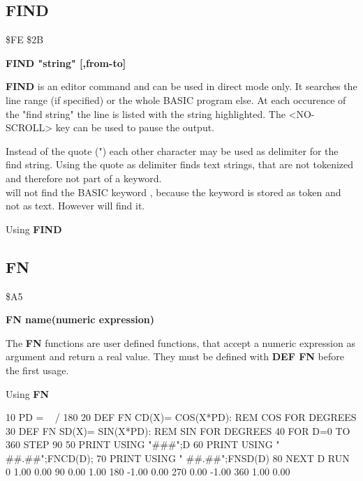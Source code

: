 \subsection{FIND}
\begin{description}[leftmargin=3cm,style=nextline]
\item [Token:] \$FE \$2B
\item [Format:] {\bf FIND "string" [,from-to]}
\item [Usage:]  {\bf FIND} is an editor command and can be used
                in direct mode only. It searches the line range
                (if specified) or the whole BASIC program else.
                At each occurence of the "find string" the line is
                listed with the string highlighted.
                The <NO-SCROLL> key can be used to pause the output.

\item [Remarks:] Instead of the quote (") each other character may be used
                 as delimiter for the find string.
                 Using the quote as delimiter finds text strings, that are
                 not tokenized and therefore not part of a keyword. \\
                  will not find
                 the BASIC keyword , because the
                 keyword is stored as token and not as text.
                 However  will
                 find it.

\item [Example:] Using {\bf FIND}
\end{description}


\newpage
\subsection{FN}
\begin{description}[leftmargin=3cm,style=nextline]
\item [Token:] \$A5
\item [Format:] {\bf FN name(numeric expression)}
\item [Usage:] The {\bf FN} functions are user defined
               functions, that accept a numeric expression as
               argument and return a real value.
               They must be defined with {\bf DEF FN} before
               the first usage.

\item [Example:] Using {\bf FN}
\begin{screenoutput}
10 PD = ~ / 180
20 DEF FN CD(X)= COS(X*PD): REM COS FOR DEGREES
30 DEF FN SD(X)= SIN(X*PD): REM SIN FOR DEGREES
40 FOR D=0 TO 360 STEP 90
50 PRINT USING "###";D
60 PRINT USING " ##.##";FNCD(D);
70 PRINT USING " ##.##";FNSD(D)
80 NEXT D
RUN
  0  1.00  0.00
 90  0.00  1.00
180 -1.00  0.00
270  0.00 -1.00
360  1.00  0.00
\end{screenoutput}
\end{description}

